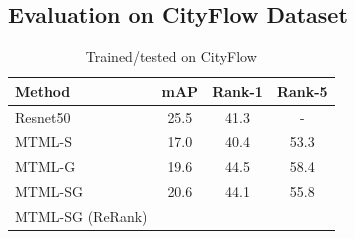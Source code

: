 \documentclass[10pt,twocolumn,letterpaper]{article}
\begin{document}



\subsection{Evaluation on CityFlow Dataset}

\begin{table}[h]
  \centering
  \begin{tabular}{l || c | c | c }
    \hline
    Method & mAP & Rank-1 & Rank-5 \\
    \hline
    Resnet50 \cite{tang2019cityflow} & 25.5 & 41.3 & - \\
    \hline
    MTML-S  & 17.0 & 40.4 & 53.3 \\
    MTML-G  & 19.6 & 44.5 & 58.4 \\
    \hdashline
    MTML-SG & 20.6 & 44.1 & 55.8 \\
    \hdashline
    MTML-SG (ReRank) &  & & \\
    \hline
  \end{tabular}
  \caption{Trained/tested on CityFlow}
  \label{T:cityflow_results}
\end{table}
\end{document}
